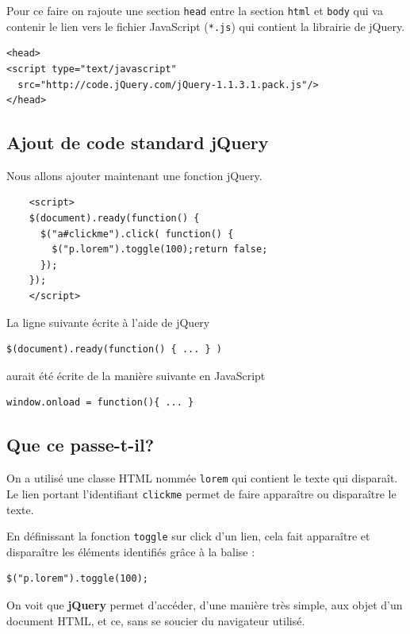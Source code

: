 \documentclass[10pt,a4paper,titlepage]{article}
\begin{document}
Pour ce faire on rajoute une section \texttt{head} entre la section \texttt{html} et \texttt{body} qui va contenir le lien vers le fichier JavaScript (\texttt{*.js}) qui contient la librairie de jQuery.



\begin{lstlisting}
<head>
<script type="text/javascript"
  src="http://code.jQuery.com/jQuery-1.1.3.1.pack.js"/>
</head>
\end{lstlisting}

\subsection{Ajout de code standard jQuery}

Nous allons ajouter maintenant une fonction jQuery.

\begin{lstlisting}
	<script>
	$(document).ready(function() {
	  $("a#clickme").click( function() {
	    $("p.lorem").toggle(100);return false;
	  });
	});
	</script>
\end{lstlisting}

La ligne suivante écrite à l'aide de jQuery

\begin{lstlisting}
$(document).ready(function() { ... } )
\end{lstlisting}

aurait été écrite de la manière suivante en JavaScript  

\begin{lstlisting}
window.onload = function(){ ... }
\end{lstlisting}

\subsection{Que ce passe-t-il?}

On a utilisé une classe HTML nommée \texttt{lorem} qui contient le texte qui disparaît. Le lien portant l'identifiant \texttt{clickme} permet de faire apparaître ou disparaître le texte. 

En définissant la fonction \texttt{toggle} sur click d'un lien, cela fait apparaître et  disparaître les éléments identifiés grâce à la balise : 

\begin{lstlisting}
$("p.lorem").toggle(100);
\end{lstlisting}

On voit que \textbf{jQuery} permet d'accéder, d'une manière très simple, aux objet d'un document HTML, et ce, sans se soucier du navigateur utilisé.
\end{document}
